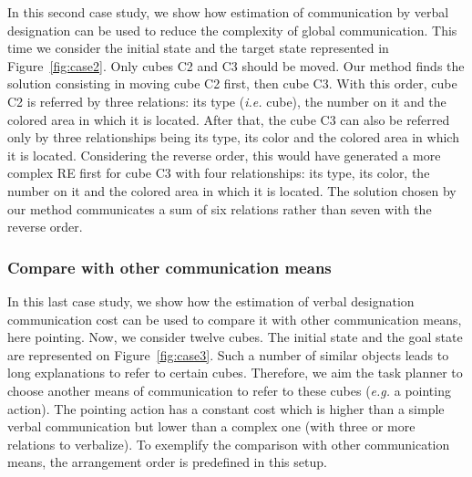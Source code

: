 \documentclass[a4paper,11pt,twoside]{StyleThese}
\begin{document}
In this second case study, we show how estimation of communication by verbal designation can be used to reduce the complexity of global communication. This time we consider the initial state and the target state represented in Figure~\ref{fig:case2}. Only cubes C2 and C3 should be moved. Our method finds the solution consisting in moving cube C2 first, then cube C3. With this order, cube C2 is referred by three relations: its type (\textit{i.e.} cube), the number on it and the colored area in which it is located. After that, the cube C3 can also be referred only by three relationships being its type, its color and the colored area in which it is located. Considering the reverse order, this would have generated a more complex RE first for cube C3 with four relationships: its type, its color, the number on it and the colored area in which it is located.
The solution chosen by our method communicates a sum of six relations rather than seven with the reverse order.

\subsubsection{Compare with other communication means}

In this last case study, we show how the estimation of verbal designation communication cost can be used to compare it with other communication means, here pointing. Now, we consider twelve cubes. The initial state and the goal state are represented on Figure~\ref{fig:case3}. Such a number of similar objects leads to long explanations to refer to certain cubes. Therefore, we aim the task planner to choose another means of communication to refer to these cubes (\textit{e.g.} a pointing action). The pointing action has a constant cost which is higher than a simple verbal communication but lower than a complex one (with three or more relations to verbalize). To exemplify the comparison with other communication means, the arrangement order is predefined in this setup. %

\end{document}
